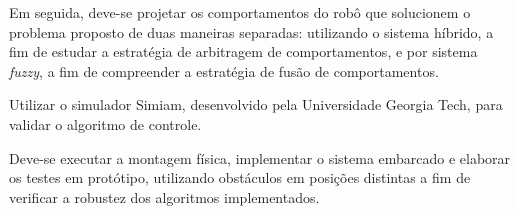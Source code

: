 Em seguida, deve-se projetar os comportamentos do robô que solucionem o problema
proposto de duas maneiras separadas: utilizando o sistema híbrido, a fim de estudar a
estratégia de arbitragem de comportamentos, e por sistema \textit{fuzzy}, a fim de compreender 
a estratégia de fusão de comportamentos. 

Utilizar o simulador Simiam, desenvolvido pela Universidade Georgia
Tech, para validar o algoritmo de controle.

Deve-se executar a montagem física, implementar o sistema embarcado e elaborar os testes em
protótipo, utilizando obstáculos em posições distintas a fim de verificar a robustez dos 
algoritmos implementados. 